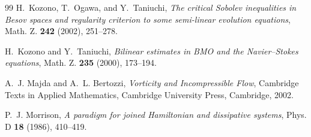 \documentclass[11pt,reqno]{amsart}
\theoremstyle{definition}
\theoremstyle{remark}
\begin{document}
\begin{thebibliography}{99}
 H.~Kozono, T.~Ogawa, and Y.~Taniuchi, \emph{The critical Sobolev inequalities in Besov spaces and regularity criterion to some semi-linear evolution equations}, Math. Z. \textbf{242} (2002), 251--278.

 H.~Kozono and Y.~Taniuchi, \emph{Bilinear estimates in BMO and the Navier--Stokes equations}, Math. Z. \textbf{235} (2000), 173--194.

 A.~J. Majda and A.~L. Bertozzi, \emph{Vorticity and Incompressible Flow}, Cambridge Texts in Applied Mathematics, Cambridge University Press, Cambridge, 2002.

 P.~J. Morrison, \emph{A paradigm for joined Hamiltonian and dissipative systems}, Phys. D \textbf{18} (1986), 410--419.

\end{thebibliography}
\end{document}
